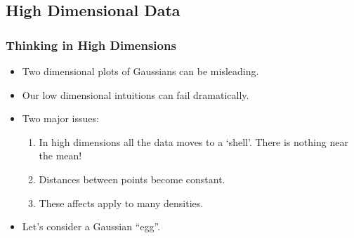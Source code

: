 \begin{frame}[fragile]
\begin{figure}
  \end{figure}



\end{frame}

\subsection{High Dimensional Data}

\begin{frame}
  \frametitle{Thinking in High Dimensions}

  \begin{itemize}
  \item Two dimensional plots of Gaussians can be misleading.
  \item Our low dimensional intuitions can fail dramatically.
  \item Two major issues:

    \begin{enumerate}
    \item In high dimensions all the data moves to a `shell'. There is nothing
      near the mean!
    \item Distances between points become constant.
    \item These affects apply to many densities.
    \end{enumerate}
  \item Let's consider a Gaussian ``egg''.
  \end{itemize}
  
\end{frame}

